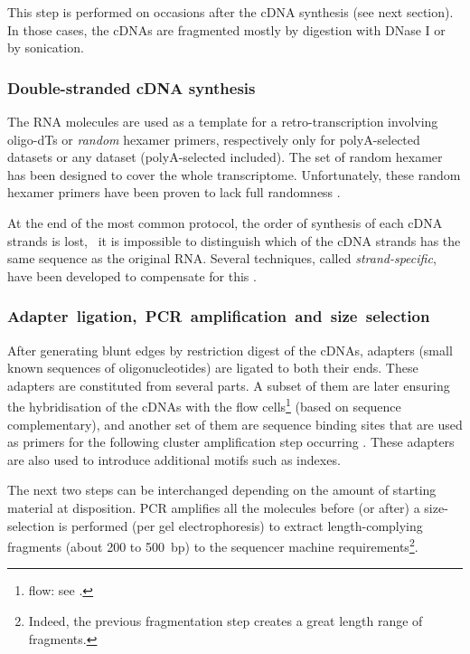 This step is performed on occasions after the \gls{cDNA} synthesis
(see next section). In those cases, the \glspl{cDNA} are fragmented mostly
by digestion with DNase I or by sonication.\mybr\

\subsubsection{Double-stranded cDNA synthesis}
The \gls{RNA} molecules are used as a template for a retro-transcription
involving oligo-dTs or \emph{random} hexamer primers, respectively only
for polyA-selected datasets or any dataset (polyA-selected included).
The set of random hexamer has been designed to cover the whole
transcriptome. Unfortunately, these random hexamer primers have been
proven to lack full randomness .\mybr\

At the end of the most common protocol, the order of synthesis of each \gls{cDNA}
strands is lost, \ie\ it is impossible to distinguish which of the \gls{cDNA}
strands has the same sequence as the original \gls{RNA}. Several techniques,
called \emph{strand-specific}, have been developed to compensate for this
.\label{strand-specific}\mybr\

\subsubsection{Adapter~ligation,~PCR~amplification~and~size~selection}

After generating blunt edges by restriction digest of the \glspl{cDNA}, adapters
(small known sequences of oligonucleotides) are ligated to both their ends.
These adapters are constituted from several parts.
A subset of them are later ensuring
the hybridisation of the \glspl{cDNA} with the flow
cells\footnote{\Gls{flow}: see .} (based on sequence
complementary), and another set of them
are sequence binding sites that are used as primers for the following cluster
amplification step occurring . These adapters are also used to
introduce additional motifs such as indexes.\mybr\

The next two steps can be interchanged depending on the amount of starting material
at disposition. \gls{PCR} amplifies all the molecules before (or after)
a size-selection is performed (per gel electrophoresis) to extract
length-complying fragments (about 200 to 500\ bp) to the sequencer machine
requirements\footnote{Indeed, the previous fragmentation step creates a great
length range of fragments.}.\mybr\

